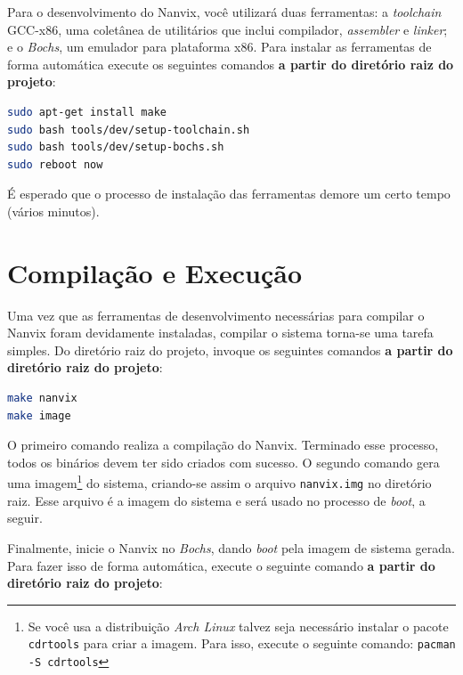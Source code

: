 \documentclass[11pt]{article}
\begin{document}
Para o desenvolvimento do Nanvix, você utilizará duas ferramentas: a \textit{toolchain} GCC-x86, uma coletânea de utilitários que inclui compilador, \textit{assembler} e \textit{linker}; e o \textit{Bochs}, um emulador para plataforma x86. Para instalar as ferramentas de forma automática execute os seguintes comandos \textbf{a partir do diretório raiz do projeto}: \\

\begin{lstlisting}[language=bash,numbers=none,frame=single]
sudo apt-get install make
sudo bash tools/dev/setup-toolchain.sh
sudo bash tools/dev/setup-bochs.sh
sudo reboot now
\end{lstlisting}

\vspace{0.3cm}
É esperado que o processo de instalação das ferramentas demore um certo tempo (vários minutos).

\section{Compilação e Execução}
\label{sec:compilacao}

Uma vez que as ferramentas de desenvolvimento necessárias para compilar o Nanvix foram devidamente instaladas, compilar o sistema torna-se uma tarefa simples. Do diretório raiz do projeto, invoque os seguintes comandos \textbf{a partir do diretório raiz do projeto}:\\

\begin{lstlisting}[language=bash,numbers=none,frame=single]
make nanvix
make image
\end{lstlisting}

\vspace{0.3cm}
O primeiro comando realiza a compilação do Nanvix. Terminado esse processo, todos os binários devem ter sido criados com sucesso. O segundo comando gera uma imagem\footnote{Se você usa a distribuição \textit{Arch Linux} talvez seja necessário instalar o pacote \texttt{cdrtools} para criar a imagem. Para isso, execute o seguinte comando: \texttt{pacman -S cdrtools}} do sistema, criando-se assim o arquivo \texttt{nanvix.img} no diretório raiz. Esse arquivo é a imagem do sistema e será usado no processo de \textit{boot}, a seguir.

Finalmente, inicie o Nanvix no \textit{Bochs}, dando \textit{boot} pela imagem de sistema gerada. Para fazer isso de forma automática, execute o seguinte comando \textbf{a partir do diretório raiz do projeto}:\\
\end{document}
